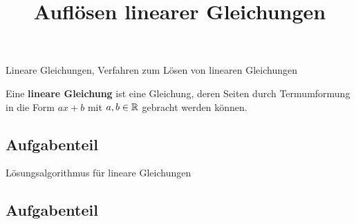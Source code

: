 \documentclass{uebungsblatt}
\title{Auflösen linearer Gleichungen}
\begin{document}
\maketitle
\begin{contents}
    Lineare Gleichungen, Verfahren zum Lösen von linearen Gleichungen
\end{contents}


\begin{definition}
    Eine \textbf{lineare Gleichung} ist eine Gleichung, deren Seiten durch Termumformung in die Form $ax+b$ mit $a,b\in\mathbb{R}$ gebracht werden können.
\end{definition}

\subsection*{Aufgabenteil}

\newpage


\begin{remark}
    Lösungsalgorithmus für lineare Gleichungen
\end{remark}

\subsection*{Aufgabenteil}

\end{document}
